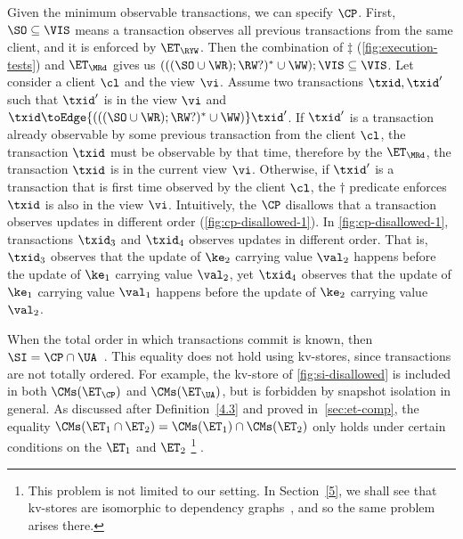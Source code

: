 Given the minimum observable transactions, we can specify $\CP$. 
First, \( \SO \subseteq \VIS \) means a transaction observes all previous transactions from the same client,
and it is enforced by \( \ET_\RYW \).
Then the combination of \( \ddagger\) (\cref{fig:execution-tests}) and \( \ET_\MRd \) gives us \( ( ( ( \SO \cup \WR ) ; \RW? )^* \cup \WW ) ; \VIS \subseteq \VIS \).
Let consider a client \( \cl \) and the view \( \vi \).
Assume two transactions \( \txid, \txid' \)  such that \( \txid' \) is in the view \( \vi \) and \( \txid \toEdge{( ( ( \SO \cup \WR ) ; \RW? )^* \cup \WW )} \txid' \).
If \( \txid' \) is a transaction already observable by some previous transaction from the client \( \cl \), 
the transaction \( \txid \) must be observable by that time,
therefore by the \( \ET_\MRd \), the transaction \( \txid \) is in the current view \( \vi \).
Otherwise, if \( \txid' \) is a transaction that is first time observed by the client \( \cl \),
the \( \dagger \) predicate enforces \( \txid \) is also in the view \( \vi \).
Intuitively, the \( \CP \) disallows that a transaction observes updates in different order (\cref{fig:cp-disallowed-1}).
In \cref{fig:cp-disallowed-1}, transactions $\txid_{3}$ and \( \txid_4 \) observes updates in different order.
That is, \( \txid_3 \) observes that the update of $\ke_2$ carrying value $\val_2$ happens before the update of $\ke_1$ carrying value $\val_2$,
yet $\txid_{4}$ observes that the update of $\ke_1$ carrying value
$\val_1$ happens before the update of $\ke_2$ carrying value
$\val_2$. 

When the total order in which transactions commit is known,
then $\SI = \CP \cap \UA$~\cite{gsi,framework-concur}. 
This equality does not hold using kv-stores, since transactions are not totally
ordered. For example, the kv-store of \cref{fig:si-disallowed} is included in both $\CMs(\ET_{\CP})$ and $\CMs(\ET_{\UA})$, 
but is forbidden by snapshot isolation in general.
As discussed after Definition~\ref{4.3} and proved in~\cref{sec:et-comp},  the equality \( \CMs(\ET_1
\cap \ET_2) = \CMs(\ET_1) \cap \CMs(\ET_2) \) only holds 
under certain conditions on the \( \ET_1 \) and \( \ET_2 \) 
\footnote{%
    This problem is not limited to our setting. In Section~\ref{5}, we
    shall see that 
     kv-stores are isomorphic to dependency 
    graphs~\cite{.}, and so the same problem arises there.%
} .



